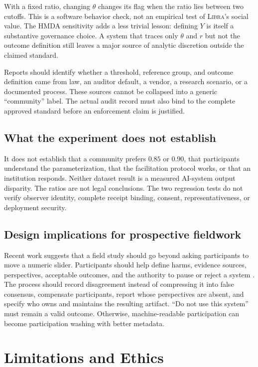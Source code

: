 \documentclass[10pt]{article}
\newcommand{\libra}{\textsc{Libra}}
\begin{document}
With a fixed ratio, changing $\theta$ changes its flag when the ratio lies
between two cutoffs. This is a software behavior check, not an empirical test
of \libra's social value. The HMDA sensitivity adds a less trivial lesson:
defining $Y$ is itself a substantive governance choice. A system that traces
only $\theta$ and $r$ but not the outcome definition still leaves a major source
of analytic discretion outside the claimed standard.

Reports should identify whether a threshold, reference group, and outcome
definition came from law, an auditor default, a vendor, a research scenario,
or a documented process. These sources cannot be collapsed into a generic
``community'' label. The actual audit record must also bind to the complete
approved standard before an enforcement claim is justified.

\subsection{What the experiment does not establish}

It does not establish that a community prefers $0.85$ or $0.90$, that
participants understand the parameterization, that the facilitation protocol
works, or that an institution responds. Neither dataset result is a measured
AI-system output disparity. The ratios are not legal conclusions. The two
regression tests do not verify observer identity, complete receipt binding,
consent, representativeness, or deployment security.

\subsection{Design implications for prospective fieldwork}

Recent work suggests that a field study should go beyond asking participants to
move a numeric slider. Participants should help define harms, evidence sources,
perspectives, acceptable outcomes, and the authority to pause or reject a
system \cite{zhao2026,dicampli2026,mushkani2026ledger}. The process should record
disagreement instead of compressing it into false consensus, compensate
participants, report whose perspectives are absent, and specify who owns and
maintains the resulting artifact. ``Do not use this system'' must remain a valid
outcome. Otherwise, machine-readable participation can become participation
washing with better metadata.

\section{Limitations and Ethics}
\end{document}
